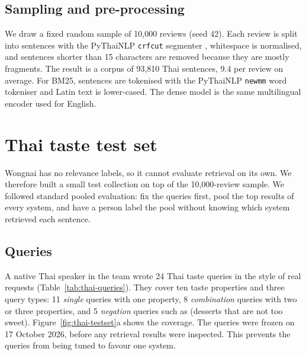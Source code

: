 \subsection{Sampling and pre-processing}
We draw a fixed random sample of 10,000 reviews (seed 42). Each review is split into sentences
with the PyThaiNLP \texttt{crfcut} segmenter \citep{phatthiyaphaibun2023pythainlp}, whitespace is
normalised, and sentences shorter than 15 characters are removed because they are mostly
fragments. The result is a corpus of 93,810 Thai sentences, 9.4 per review on average. For BM25,
sentences are tokenised with the PyThaiNLP \texttt{newmm} word tokeniser and Latin text is
lower-cased. The dense model is the same multilingual encoder used for English.

\section{Thai taste test set}
Wongnai has no relevance labels, so it cannot evaluate retrieval on its own. We therefore built a
small test collection on top of the 10,000-review sample. We followed standard pooled
evaluation: fix the queries first, pool the top results of every system, and have a person label
the pool without knowing which system retrieved each sentence.

\subsection{Queries}
A native Thai speaker in the team wrote 24 Thai taste queries in the style of real requests (Table~\ref{tab:thai-queries}).
They cover ten taste properties and three query types: 11 \emph{single} queries with one
property, 8 \emph{combination} queries with two or three properties, and 5 \emph{negation}
queries such as  (desserts that are not too sweet).
Figure~\ref{fig:thai-testset}a shows the coverage. The queries were frozen on 17 October 2026, before any retrieval results were
inspected. This prevents the queries from being tuned to favour one system.

